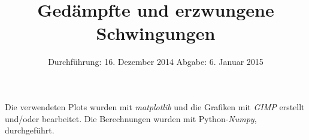 
\usepackage{marvosym}
\subject{Anfängerpraktikum V354}
\title{Gedämpfte und erzwungene Schwingungen
}
\date{
  Durchführung: 16. Dezember 2014
  \hspace{1em}
  Abgabe: 6. Januar 2015
}


\maketitle
\newpage





\printbibliography
\noindent Die verwendeten Plots wurden mit \textit{matplotlib}\cite{matplotlib} und die Grafiken mit \textit{GIMP}\cite{gimp} erstellt und/oder bearbeitet.
Die Berechnungen wurden mit Python-\textit{Numpy}, \cite{numpy} durchgeführt.

